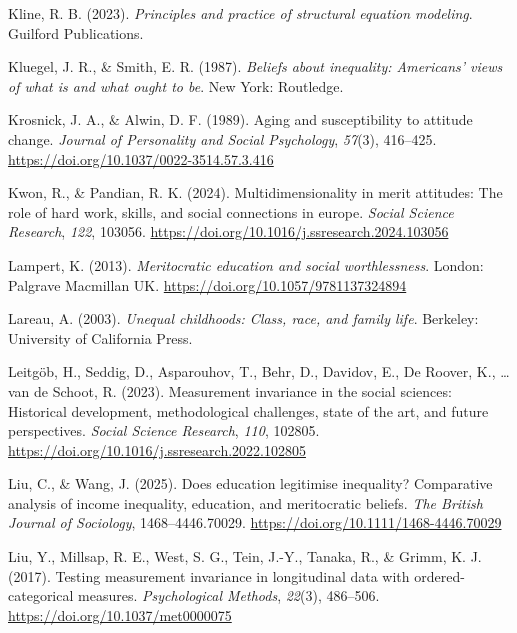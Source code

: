 \documentclass[
  13pt,
]{article}
\newlength{\cslhangindent}
\newenvironment{CSLReferences}[2] %
 {\begin{list}{}{%
  \setlength{\itemindent}{0pt}
  \setlength{\leftmargin}{0pt}
  \setlength{\parsep}{0pt}
  \ifodd #1
   \setlength{\leftmargin}{\cslhangindent}
   \setlength{\itemindent}{-1\cslhangindent}
  \fi
  \setlength{\itemsep}{#2\baselineskip}}}
 {\end{list}}
\begin{document}
\begin{CSLReferences}{1}{0}
Kline, R. B. (2023). \emph{Principles and practice of structural
equation modeling}. Guilford Publications.

Kluegel, J. R., \& Smith, E. R. (1987). \emph{Beliefs about inequality:
Americans' views of what is and what ought to be}. New York: Routledge.

Krosnick, J. A., \& Alwin, D. F. (1989). Aging and susceptibility to
attitude change. \emph{Journal of Personality and Social Psychology},
\emph{57}(3), 416--425. \url{https://doi.org/10.1037/0022-3514.57.3.416}

Kwon, R., \& Pandian, R. K. (2024). Multidimensionality in merit
attitudes: The role of hard work, skills, and social connections in
europe. \emph{Social Science Research}, \emph{122}, 103056.
\url{https://doi.org/10.1016/j.ssresearch.2024.103056}

Lampert, K. (2013). \emph{Meritocratic education and social
worthlessness}. London: Palgrave Macmillan UK.
\url{https://doi.org/10.1057/9781137324894}

Lareau, A. (2003). \emph{Unequal childhoods: Class, race, and family
life}. Berkeley: University of California Press.

Leitgöb, H., Seddig, D., Asparouhov, T., Behr, D., Davidov, E., De
Roover, K., \ldots{} van de Schoot, R. (2023). Measurement invariance in
the social sciences: Historical development, methodological challenges,
state of the art, and future perspectives. \emph{Social Science
Research}, \emph{110}, 102805.
\url{https://doi.org/10.1016/j.ssresearch.2022.102805}

Liu, C., \& Wang, J. (2025). Does education legitimise inequality?
Comparative analysis of income inequality, education, and meritocratic
beliefs. \emph{The British Journal of Sociology}, 1468--4446.70029.
\url{https://doi.org/10.1111/1468-4446.70029}

Liu, Y., Millsap, R. E., West, S. G., Tein, J.-Y., Tanaka, R., \& Grimm,
K. J. (2017). Testing measurement invariance in longitudinal data with
ordered-categorical measures. \emph{Psychological Methods},
\emph{22}(3), 486--506. \url{https://doi.org/10.1037/met0000075}


\end{CSLReferences}
\end{document}
